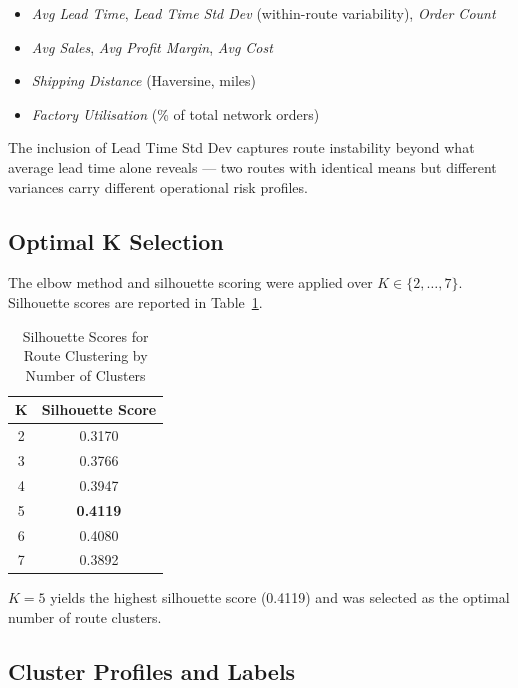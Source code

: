 \documentclass[12pt, a4paper]{article}
\begin{document}
\begin{itemize}[leftmargin=*, itemsep=0pt]
    \item \textit{Avg Lead Time}, \textit{Lead Time Std Dev}
          (within-route variability), \textit{Order Count}
    \item \textit{Avg Sales}, \textit{Avg Profit Margin},
          \textit{Avg Cost}
    \item \textit{Shipping Distance} (Haversine, miles)
    \item \textit{Factory Utilisation} (\% of total network
          orders)
\end{itemize}

The inclusion of Lead Time Std Dev captures route instability
beyond what average lead time alone reveals --- two routes with
identical means but different variances carry different
operational risk profiles.

\subsection{Optimal K Selection}

The elbow method and silhouette scoring \citep{rousseeuw1987}
were applied over $K \in \{2, \ldots, 7\}$. Silhouette scores
are reported in Table~\ref{tab:silhouette}.

\begin{table}[H]
\centering
\caption{Silhouette Scores for Route Clustering
         by Number of Clusters}
\label{tab:silhouette}
\renewcommand{\arraystretch}{1.12}
\begin{tabular}{cc}
\toprule
\textbf{K} & \textbf{Silhouette Score} \\
\midrule
2 & 0.3170 \\
3 & 0.3766 \\
4 & 0.3947 \\
\rowcolor{lightgray}
5 & \textbf{0.4119} \\
6 & 0.4080 \\
7 & 0.3892 \\
\bottomrule
\end{tabular}
\end{table}

$K = 5$ yields the highest silhouette score (0.4119) and was
selected as the optimal number of route clusters.

\subsection{Cluster Profiles and Labels}
\end{document}
